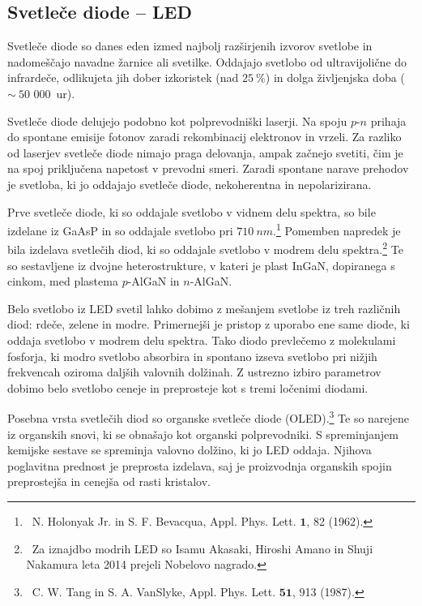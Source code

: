 \subsection{Svetleče diode -- LED}
Svetleče diode so danes eden izmed najbolj razširjenih izvorov svetlobe in nadomeščajo
navadne žarnice ali svetilke. Oddajajo svetlobo od ultravijolične do infrardeče, 
odlikujeta jih 
dober izkoristek (nad $25~\%$) in dolga življenjska doba ($\sim~50\,\,000$~ur).

Svetleče diode delujejo podobno kot polprevodniški laserji. Na spoju $p$-$n$ prihaja do 
spontane emisije fotonov zaradi rekombinacij elektronov in vrzeli. Za razliko od laserjev 
svetleče diode nimajo praga delovanja, ampak začnejo svetiti, čim je na spoj priključena 
napetost v prevodni smeri. Zaradi spontane narave prehodov je svetloba, ki jo oddajajo
svetleče diode, nekoherentna in nepolarizirana. 

Prve svetleče diode, ki so oddajale svetlobo v vidnem delu spektra,
so bile izdelane iz GaAsP in so oddajale 
svetlobo pri $710~\si{nm}$.\footnote{~N. Holonyak Jr. in S. F. Bevacqua, Appl. Phys. Lett.
${\mathbf 1}$, 82 (1962).} Pomemben
napredek je bila izdelava svetlečih diod, ki so oddajale svetlobo v modrem delu 
spektra.\footnote{~Za iznajdbo modrih LED so Isamu Akasaki, Hiroshi Amano in 
Shuji Nakamura leta 2014 prejeli Nobelovo nagrado.} Te so sestavljene iz dvojne
heterostrukture, v kateri je plast InGaN, dopiranega s cinkom, 
med plastema $p$-AlGaN in $n$-AlGaN.

Belo svetlobo iz LED svetil lahko dobimo z mešanjem svetlobe iz treh različnih 
diod: rdeče, zelene in modre. Primernejši je pristop z uporabo ene same diode, 
ki oddaja svetlobo v modrem delu spektra. Tako diodo prevlečemo z molekulami fosforja, ki
modro svetlobo absorbira in spontano izseva svetlobo pri nižjih frekvencah 
oziroma daljših valovnih dolžinah. Z ustrezno izbiro parametrov dobimo belo svetlobo
ceneje in preprosteje kot s tremi ločenimi diodami. 

\begin{remark}
Posebna vrsta svetlečih diod so organske svetleče diode (OLED).\footnote{~C. W. Tang in
S. A. VanSlyke, Appl. Phys. Lett. $\mathbf{51}$, 913 (1987).} Te so narejene iz
organskih snovi, ki se obnašajo kot organski polprevodniki. S spreminjanjem kemijske
sestave se spreminja valovno dolžino, ki jo LED oddaja. Njihova poglavitna prednost
je preprosta izdelava, saj je proizvodnja organskih spojin preprostejša in cenejša
od rasti kristalov. 
\end{remark}
